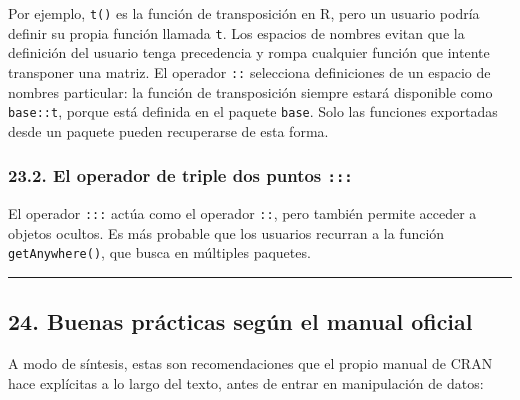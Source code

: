 \documentclass[
  jou,
  floatsintext,
  longtable,
  a4paper,
  nolmodern,
  notxfonts,
  notimes,
  12pt,
  colorlinks=true,linkcolor=blue,citecolor=blue,urlcolor=blue]{apa7}
\begin{document}
Por ejemplo, \texttt{t()} es la función de transposición en R, pero un
usuario podría definir su propia función llamada \texttt{t}. Los
espacios de nombres evitan que la definición del usuario tenga
precedencia y rompa cualquier función que intente transponer una matriz.
El operador \texttt{::} selecciona definiciones de un espacio de nombres
particular: la función de transposición siempre estará disponible como
\texttt{base::t}, porque está definida en el paquete \texttt{base}. Solo
las funciones exportadas desde un paquete pueden recuperarse de esta
forma.

\subsubsection{\texorpdfstring{23.2. El operador de triple dos puntos
\texttt{:::}}{23.2. El operador de triple dos puntos :::}}\label{el-operador-de-triple-dos-puntos}

El operador \texttt{:::} actúa como el operador \texttt{::}, pero
también permite acceder a objetos ocultos. Es más probable que los
usuarios recurran a la función \texttt{getAnywhere()}, que busca en
múltiples paquetes.

\begin{center}\rule{0.5\linewidth}{0.5pt}\end{center}

\subsection{24. Buenas prácticas según el manual
oficial}\label{buenas-pruxe1cticas-seguxfan-el-manual-oficial}

A modo de síntesis, estas son recomendaciones que el propio manual de
CRAN hace explícitas a lo largo del texto, antes de entrar en
manipulación de datos:
\end{document}
